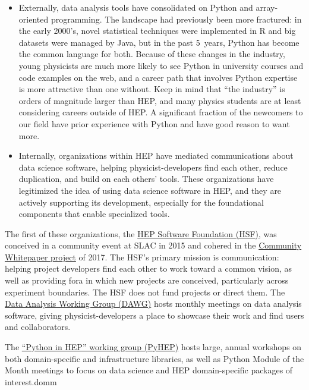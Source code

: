 \documentclass{article}
\begin{document}
\begin{itemize}
\item Externally, data analysis tools have consolidated on Python and array-oriented programming. The landscape had previously been more fractured: in the early 2000's, novel statistical techniques were implemented in R and big datasets were managed by Java, but in the past 5~years, Python has become the common language for both. Because of these changes in the industry, young physicists are much more likely to see Python in university courses and code examples on the web, and a career path that involves Python expertise is more attractive than one without. Keep in mind that ``the industry'' is orders of magnitude larger than HEP, and many physics students are at least considering careers outside of HEP. A significant fraction of the newcomers to our field have prior experience with Python and have good reason to want more.

\item Internally, organizations within HEP have mediated communications about data science software, helping physicist-developers find each other, reduce duplication, and build on each others' tools. These organizations have legitimized the idea of using data science software in HEP, and they are actively supporting its development, especially for the foundational components that enable specialized tools.
\end{itemize}

The first of these organizations, the \href{https://hepsoftwarefoundation.org/}{HEP Software Foundation (HSF)}, was conceived in a community event at SLAC in 2015 and cohered in the \href{https://hepsoftwarefoundation.org/organization/cwp.html}{Community Whitepaper project} of 2017. The HSF's primary mission is communication: helping project developers find each other to work toward a common vision, as well as providing fora in which new projects are conceived, particularly across experiment boundaries. The HSF does not fund projects or direct them. The \href{https://hepsoftwarefoundation.org/workinggroups/dataanalysis.html}{Data Analysis Working Group (DAWG)} hosts monthly meetings on data analysis software, giving physicist-developers a place to showcase their work and find users and collaborators.

The \href{https://hepsoftwarefoundation.org/workinggroups/pyhep.html}{``Python in HEP'' working group (PyHEP)} hosts large, annual workshops on both domain-specific and infrastructure libraries, as well as Python Module of the Month meetings to focus on data science and HEP domain-specific packages of interest.domm
\end{document}

